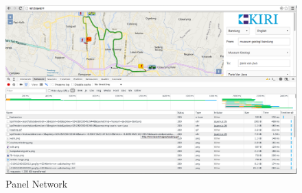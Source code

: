 \begin{figure}[H]
	\centering
	\includegraphics[scale=0.3]{Gambar/devtools-network}
	\caption{Panel Network} 
	\label{fig:2_devtools_network}
\end{figure}

